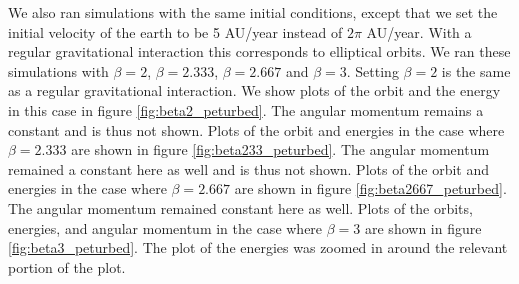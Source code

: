 \documentclass[reprint,english,notitlepage]{revtex4-1}  %
\begin{document}
We also ran simulations with the same initial conditions, except that we set the initial velocity of the earth to be 5 AU/year instead of $2\pi$ AU/year. With a regular gravitational interaction this corresponds to elliptical orbits. We ran these simulations with $\beta = 2$, $\beta = 2.333$, $\beta = 2.667$ and $\beta = 3$. Setting $\beta=2$ is the same as a regular gravitational interaction. We show plots of the orbit and the energy in this case in figure \ref{fig:beta2_peturbed}. The angular momentum remains a constant and is thus not shown. Plots of the orbit and energies in the case where $\beta = 2.333$ are shown in figure \ref{fig:beta233_peturbed}. The angular momentum remained a constant here as well and is thus not shown. Plots of the orbit and energies in the case where $\beta = 2.667$ are shown in figure \ref{fig:beta2667_peturbed}. The angular momentum remained constant here as well. Plots of the orbits, energies, and angular momentum in the case where $\beta = 3$ are shown in figure \ref{fig:beta3_peturbed}. The plot of the energies was zoomed in around the relevant portion of the plot. 
\end{document}

